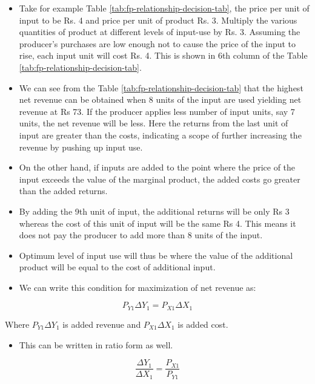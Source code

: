 \documentclass[12pt,ignorenonframetext,aspectratio=169]{beamer}
\providecommand{\tightlist}{%
  \setlength{\itemsep}{0pt}\setlength{\parskip}{0pt}}
\begin{document}
\begin{frame}{}
\protect\hypertarget{section-16}{}
\begin{itemize}
\tightlist
\item
  Take for example Table \ref{tab:fp-relationship-decision-tab}, the
  price per unit of input to be Rs. 4 and price per unit of product Rs.
  3. Multiply the various quantities of product at different levels of
  input-use by Rs. 3. Assuming the producer's purchases are low enough
  not to cause the price of the input to rise, each input unit will cost
  Rs. 4. This is shown in 6th column of the Table
  \ref{tab:fp-relationship-decision-tab}.
\item
  We can see from the Table \ref{tab:fp-relationship-decision-tab} that
  the highest net revenue can be obtained when 8 units of the input are
  used yielding net revenue at Rs 73. If the producer applies less
  number of input units, say 7 units, the net revenue will be less. Here
  the returns from the last unit of input are greater than the costs,
  indicating a scope of further increasing the revenue by pushing up
  input use.
\end{itemize}
\end{frame}

\begin{frame}{}
\protect\hypertarget{section-17}{}
\begin{itemize}
\tightlist
\item
  On the other hand, if inputs are added to the point where the price of
  the input exceeds the value of the marginal product, the added costs
  go greater than the added returns.
\item
  By adding the 9th unit of input, the additional returns will be only
  Rs 3 whereas the cost of this unit of input will be the same Rs 4.
  This means it does not pay the producer to add more than 8 units of
  the input.
\item
  Optimum level of input use will thus be where the value of the
  additional product will be equal to the cost of additional input.
\end{itemize}
\end{frame}

\begin{frame}{}
\protect\hypertarget{section-18}{}
\begin{itemize}
\tightlist
\item
  We can write this condition for maximization of net revenue as:
\end{itemize}

\[
P_{Y1} \Delta Y_1 = P_{X1} \Delta X_1
\]

Where \(P_{Y1} \Delta Y_1\) is added revenue and \(P_{X1} \Delta X_1\)
is added cost.

\begin{itemize}
\tightlist
\item
  This can be written in ratio form as well.
\end{itemize}

\[
\frac{\Delta Y_1}{\Delta X_1} = \frac{P_{X1}}{P_{Y1}}
\]
\end{frame}
\end{document}
